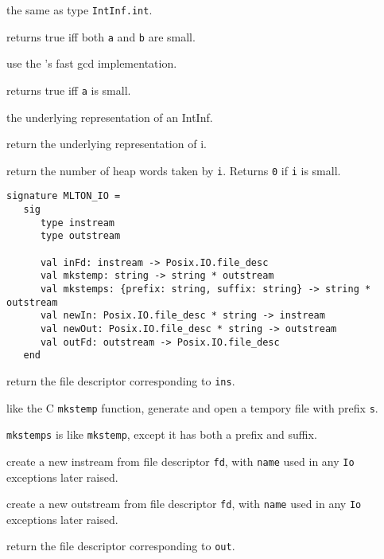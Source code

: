 \begin{description}

the same as type {\tt IntInf.int}.

returns true iff both {\tt a} and {\tt b} are small.

use the {\gmp}'s fast gcd implementation.

returns true iff {\tt a} is small.

the underlying representation of an IntInf.

return the underlying representation of i.

return the number of heap words taken by {\tt i}.  Returns {\tt 0} if
{\tt i} is small.

\end{description}


\begin{verbatim}
signature MLTON_IO =
   sig
      type instream
      type outstream

      val inFd: instream -> Posix.IO.file_desc
      val mkstemp: string -> string * outstream
      val mkstemps: {prefix: string, suffix: string} -> string * outstream
      val newIn: Posix.IO.file_desc * string -> instream
      val newOut: Posix.IO.file_desc * string -> outstream
      val outFd: outstream -> Posix.IO.file_desc
   end
\end{verbatim}

\begin{description}

 return the file descriptor corresponding to {\tt ins}.

like the C {\tt mkstemp} function, generate and open a tempory file with prefix
{\tt s}.

{\tt mkstemps} is like {\tt mkstemp}, except it has both a prefix and suffix.

 create a new instream from file descriptor
{\tt fd}, with {\tt name} used in any {\tt Io} exceptions later
raised.

 create a new outstream from file descriptor
{\tt  fd}, with {\tt name} used in any {\tt Io} exceptions later
raised.

 return the file descriptor corresponding to
{\tt out}.
\end{description}

